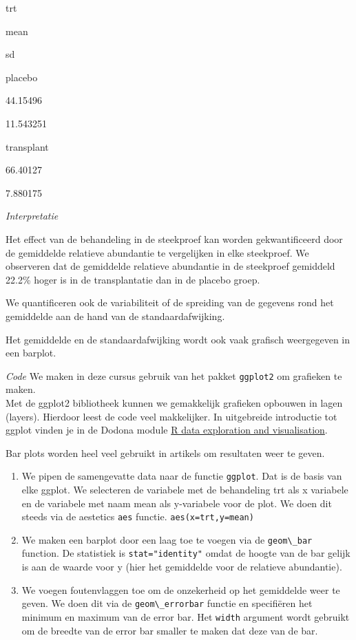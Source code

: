 \documentclass[
  12pt,dutch,coursenotes]{book}
\newcommand{\passthrough}[1]{#1}
\theoremstyle{definition}
\theoremstyle{definition}
\theoremstyle{definition}
\theoremstyle{definition}
\theoremstyle{remark}
\begin{document}
trt

mean

sd

placebo

44.15496

11.543251

transplant

66.40127

7.880175

\emph{Interpretatie}

Het effect van de behandeling in de steekproef kan worden gekwantificeerd door de gemiddelde relatieve abundantie te vergelijken in elke steekproef. We observeren dat de gemiddelde relatieve abundantie in de steekproef gemiddeld 22.2\% hoger is in de transplantatie dan in de placebo groep.

We quantificeren ook de variabiliteit of de spreiding van de gegevens rond het gemiddelde aan de hand van de standaardafwijking.

Het gemiddelde en de standaardafwijking wordt ook vaak grafisch weergegeven in een barplot.

\emph{Code}
We maken in deze cursus gebruik van het pakket \passthrough{\lstinline!ggplot2!} om grafieken te maken.\\
Met de ggplot2 bibliotheek kunnen we gemakkelijk grafieken opbouwen in lagen (layers).
Hierdoor leest de code veel makkelijker.
In uitgebreide introductie tot ggplot vinden je in de Dodona module \href{https://dodona.ugent.be/nl/courses/345/}{R data exploration and visualisation}.

Bar plots worden heel veel gebruikt in artikels om resultaten weer te geven.

\begin{enumerate}
\def\labelenumi{\arabic{enumi}.}
\item
  We pipen de samengevatte data naar de functie \passthrough{\lstinline!ggplot!}. Dat is de basis van elke ggplot. We selecteren de variabele met de behandeling trt als x variabele en de variabele met naam mean als y-variabele voor de plot.
  We doen dit steeds via de aestetics \passthrough{\lstinline!aes!} functie. \passthrough{\lstinline!aes(x=trt,y=mean)!}
\item
  We maken een barplot door een laag toe te voegen via de \passthrough{\lstinline!geom\_bar!} function. De statistiek is \passthrough{\lstinline!stat="identity"!} omdat de hoogte van de bar gelijk is aan de waarde voor y (hier het gemiddelde voor de relatieve abundantie).
\item
  We voegen foutenvlaggen toe om de onzekerheid op het gemiddelde weer te geven. We doen dit via de \passthrough{\lstinline!geom\_errorbar!} functie en specifiëren het minimum en maximum van de error bar. Het \passthrough{\lstinline!width!} argument wordt gebruikt om de breedte van de error bar smaller te maken dat deze van de bar.
\end{enumerate}
\end{document}
